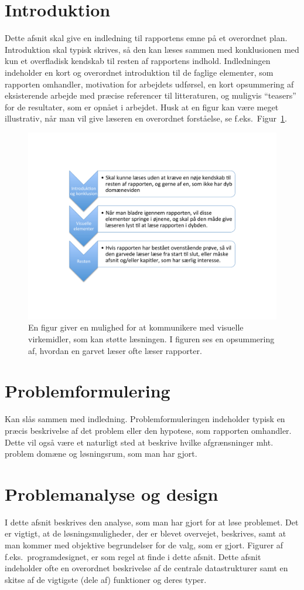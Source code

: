 \documentclass[a4paper]{article}
\begin{document}
\section{Introduktion}
Dette afsnit skal give en indledning til rapportens emne på et overordnet plan. Introduktion skal typisk skrives, så den kan læses sammen med konklusionen med kun et overfladisk kendskab til resten af rapportens indhold. Indledningen indeholder en kort og overordnet introduktion til de faglige elementer, som rapporten omhandler, motivation for arbejdets udførsel, en kort opsummering af eksisterende arbejde med præcise referencer til litteraturen, og muligvis "`teasers"' for de resultater, som er opnået i arbejdet. Husk at en figur kan være meget illustrativ, når man vil give læseren en overordnet forståelse, se f.eks.\ Figur~\ref{fig:eksempel}.
\begin{figure}
  \centering
  \includegraphics[width=0.6\linewidth]{Reading} %
  \caption{En figur giver en mulighed for at kommunikere med visuelle virkemidler, som kan støtte læsningen. I figuren ses en opsummering af, hvordan en garvet læser ofte læser rapporter.}
  \label{fig:eksempel}
\end{figure}

\section{Problemformulering}
Kan slås sammen med indledning. Problemformuleringen indeholder typisk en præcis beskrivelse af det problem eller den hypotese, som rapporten omhandler. Dette vil også være et naturligt sted at beskrive hvilke afgrænsninger mht. problem domæne og løsningsrum, som man har gjort.

\section{Problemanalyse og design}
I dette afsnit beskrives den analyse, som man har gjort for at løse problemet. Det er vigtigt, at de løsningsmuligheder, der er blevet overvejet, beskrives, samt at man kommer med objektive begrundelser for de valg, som er gjort. Figurer af f.eks.\ programdesignet, er som regel at finde i dette afsnit. Dette afsnit indeholder ofte en overordnet beskrivelse af de centrale datastrukturer samt en skitse af de vigtigste (dele af) funktioner og deres typer.
\end{document}
